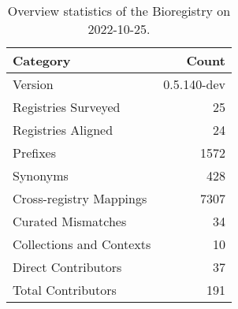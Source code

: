 \begin{table}
\centering
\caption{Overview statistics of the Bioregistry on 2022-10-25.}
\label{tab:bioregistry-summary}
\begin{tabular}{lr}
\toprule
                Category &       Count \\
\midrule
                 Version & 0.5.140-dev \\
     Registries Surveyed &          25 \\
      Registries Aligned &          24 \\
                Prefixes &        1572 \\
                Synonyms &         428 \\
 Cross-registry Mappings &        7307 \\
      Curated Mismatches &          34 \\
Collections and Contexts &          10 \\
     Direct Contributors &          37 \\
      Total Contributors &         191 \\
\bottomrule
\end{tabular}
\end{table}
